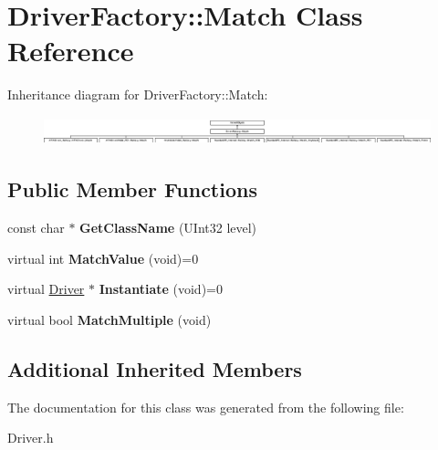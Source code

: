 \hypertarget{class_driver_factory_1_1_match}{}\section{Driver\+Factory\+:\+:Match Class Reference}
\label{class_driver_factory_1_1_match}
Inheritance diagram for Driver\+Factory\+:\+:Match\+:\begin{figure}[H]
\begin{center}
\leavevmode
\includegraphics[height=0.827586cm]{class_driver_factory_1_1_match}
\end{center}
\end{figure}
\subsection*{Public Member Functions}
\begin{DoxyCompactItemize}
\item 
\mbox{\label{class_driver_factory_1_1_match_a06de5e6e15c3e71614feff4d37539291}} 
const char $\ast$ {\bfseries Get\+Class\+Name} (U\+Int32 level)
\item 
\mbox{\label{class_driver_factory_1_1_match_aa6eb9d234199a633c0d714415425b705}} 
virtual int {\bfseries Match\+Value} (void)=0
\item 
\mbox{\label{class_driver_factory_1_1_match_a80c28c9ed76337479cc75a3a99d2a9f7}} 
virtual \hyperlink{class_driver}{Driver} $\ast$ {\bfseries Instantiate} (void)=0
\item 
\mbox{\label{class_driver_factory_1_1_match_ae96d422414ba05ca792f0b8ef855e7b3}} 
virtual bool {\bfseries Match\+Multiple} (void)
\end{DoxyCompactItemize}
\subsection*{Additional Inherited Members}


The documentation for this class was generated from the following file\+:\begin{DoxyCompactItemize}
\item 
Driver.\+h\end{DoxyCompactItemize}
